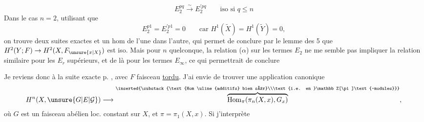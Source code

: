\[
E_2^{pq}\xrightarrow{\sim}E^{\prime pq}_2\qquad\text{iso si }q\leq n
\tag*{($\alpha$)}
\]
Dans le cas $n=2$, utilisant que
\[
E_2^{p1}=E^{\prime p1}_2=0\qquad\text{car }H^1(\widetilde X)=H^1(\widetilde Y)=0,
\]
on trouve deux suites exactes
et un hom de l'une dans l'autre, qui permet de conclure par le lemme des 5 que $H^2(Y;F)\to H^2(X,F_{\unsure{x|X}})$ est iso.
Mais pour $n$ quelconque, la relation ($\alpha$) sur les termes $E_2$  ne me semble pas impliquer la relation similaire pour les $E_r$ supérieurs, et de là pour les termes $E_\infty$, ce qui permettrait de conclure

Je reviens donc à la suite exacte p. , avec $F$ faisceau \uline{tordu}. J'ai envie de trouver une application canonique
\[
H^n(X,\unsure{G|E|\mathcal G})\longrightarrow\overbrace{\mathrm{Hom}_{\pi}(\pi_n(X,x),G_x)}^{\inserted{\substack{\text{Hom \uline{additifs} bien sûr}\\\text{i.e. en }\mathbb Z[\pi]\text{-modules}}}}, 
\]
où $G$ est un faisceau abélien loc. constant  sur $X$, et $\pi=\pi_1(X,x)$. Si j'interprète
